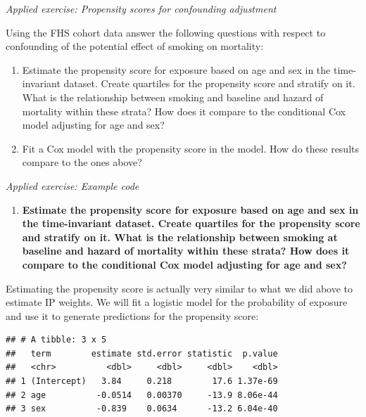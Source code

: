 \documentclass[
]{book}
\newenvironment{Shaded}{\begin{snugshade}}{\end{snugshade}}
\newcommand{\DataTypeTok}[1]{\textcolor[rgb]{0.13,0.29,0.53}{#1}}
\newcommand{\KeywordTok}[1]{\textcolor[rgb]{0.13,0.29,0.53}{\textbf{#1}}}
\newcommand{\NormalTok}[1]{#1}
\newcommand{\OperatorTok}[1]{\textcolor[rgb]{0.81,0.36,0.00}{\textbf{#1}}}
\newcommand{\StringTok}[1]{\textcolor[rgb]{0.31,0.60,0.02}{#1}}
\providecommand{\tightlist}{%
  \setlength{\itemsep}{0pt}\setlength{\parskip}{0pt}}
\begin{document}
\emph{Applied exercise: Propensity scores for confounding adjustment}

Using the FHS cohort data answer the following questions with respect to confounding of the potential effect of smoking on mortality:

\begin{enumerate}
\def\labelenumi{\arabic{enumi}.}
\tightlist
\item
  Estimate the propensity score for exposure based on age and sex in the time-invariant dataset. Create quartiles for the propensity score and stratify on it. What is the relationship between smoking and baseline and hazard of mortality within these strata? How does it compare to the conditional Cox model adjusting for age and sex?
\item
  Fit a Cox model with the propensity score in the model. How do these results compare to the ones above?
\end{enumerate}

\emph{Applied exercise: Example code}

\begin{enumerate}
\def\labelenumi{\arabic{enumi}.}
\tightlist
\item
  \textbf{Estimate the propensity score for exposure based on age and sex in the time-invariant dataset. Create quartiles for the propensity score and stratify on it. What is the relationship between smoking at baseline and hazard of mortality within these strata? How does it compare to the conditional Cox model adjusting for age and sex?}
\end{enumerate}

Estimating the propensity score is actually very similar to what we did above to estimate IP weights. We will fit a logistic model for the probability of exposure and use it to generate predictions for the propensity score:

\begin{Shaded}
\end{Shaded}

\begin{verbatim}
## # A tibble: 3 x 5
##   term        estimate std.error statistic  p.value
##   <chr>          <dbl>     <dbl>     <dbl>    <dbl>
## 1 (Intercept)   3.84     0.218        17.6 1.37e-69
## 2 age          -0.0514   0.00370     -13.9 8.06e-44
## 3 sex          -0.839    0.0634      -13.2 6.04e-40
\end{verbatim}
\end{document}
